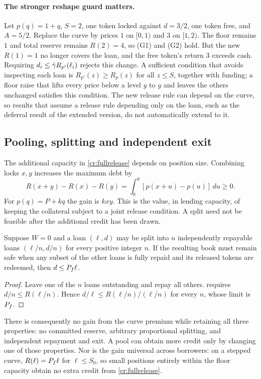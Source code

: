 \paragraph{The stronger reshape guard matters.}
Let $p(q)=1+q$, $S=2$, one token locked against $d=3/2$, one token free, and $A=5/2$. Replace the curve by prices $1$ on $[0,1)$ and $3$ on $[1,2)$. The floor remains $1$ and total reserve remains $R(2)=4$, so (G1) and (G2) hold. But the new $R(1)=1$ no longer covers the loan, and the free token's return $3$ exceeds cash. Requiring $d_i\le\bar\gamma R_{p'}(\ell_i)$ rejects this change. A sufficient condition that avoids inspecting each loan is $R_{p'}(z)\ge R_p(z)$ for all $z\le S$, together with funding; a floor raise that lifts every price below a level $y$ to $y$ and leaves the others unchanged satisfies this condition. The new release rule can depend on the curve, so results that assume a release rule depending only on the loan, such as the deferral result of the extended version, do not automatically extend to it.

\subsection{Pooling, splitting and independent exit}\label{cr:pooling}

The additional capacity in \eqref{cr:fullrelease} depends on position size. Combining locks $x,y$ increases the maximum debt by
\begin{equation}\label{cr:poolgain}
R(x+y)-R(x)-R(y)
=\int_0^y[p(x+u)-p(u)]\,du\ge0.
\end{equation}
For $p(q)=P+kq$ the gain is $kxy$. This is the value, in lending capacity, of keeping the collateral subject to a joint release condition. A split need not be feasible after the additional credit has been drawn.

\begin{proposition}\label{cr:splitting}
Suppose $W=0$ and a loan $(\ell,d)$ may be split into $n$ independently repayable loans $(\ell/n,d/n)$ for every positive integer $n$. If the resulting book must remain safe when any subset of the other loans is fully repaid and its released tokens are redeemed, then $d\le P_f\ell$.
\end{proposition}
\begin{proof}
Leave one of the $n$ loans outstanding and repay all others.  requires $d/n\le R(\ell/n)$. Hence $d/\ell\le R(\ell/n)/(\ell/n)$ for every $n$, whose limit is $P_f$.
\end{proof}

There is consequently no gain from the curve premium while retaining all three properties: no committed reserve, arbitrary proportional splitting, and independent repayment and exit. A pool can obtain more credit only by changing one of those properties. Nor is the gain universal across borrowers: on a stepped curve, $R(\ell)=P_f\ell$ for $\ell\le S_0$, so small positions entirely within the floor capacity obtain no extra credit from \eqref{cr:fullrelease}.

